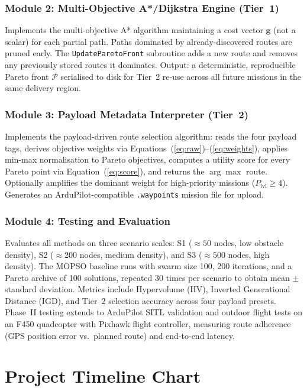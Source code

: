\documentclass{ssnreview}
\begin{document}
\subsection{Module 2: Multi-Objective A*/Dijkstra Engine (Tier~1)}
Implements the multi-objective A* algorithm maintaining a cost vector $\mathbf{g}$ (not
a scalar) for each partial path. Paths dominated by already-discovered routes are pruned
early. The \texttt{UpdateParetoFront} subroutine adds a new route and removes any
previously stored routes it dominates. Output: a deterministic, reproducible Pareto
front $\mathcal{P}$ serialised to disk for Tier~2 re-use across all future missions in
the same delivery region.

\subsection{Module 3: Payload Metadata Interpreter (Tier~2)}
Implements the payload-driven route selection algorithm: reads the four payload tags,
derives objective weights via Equations~(\ref{eq:raw})--(\ref{eq:weights}), applies
min-max normalisation to Pareto objectives, computes a utility score for every Pareto
point via Equation~(\ref{eq:score}), and returns the $\arg\max$ route. Optionally
amplifies the dominant weight for high-priority missions ($P_\mathrm{lvl} \geq 4$).
Generates an ArduPilot-compatible \texttt{.waypoints} mission file for upload.

\subsection{Module 4: Testing and Evaluation}
Evaluates all methods on three scenario scales: S1 (${\approx}50$ nodes, low obstacle
density), S2 (${\approx}200$ nodes, medium density), and S3 (${\approx}500$ nodes, high
density). The MOPSO baseline runs with swarm size 100, 200 iterations, and a Pareto
archive of 100 solutions, repeated 30 times per scenario to obtain mean $\pm$ standard
deviation. Metrics include Hypervolume (HV), Inverted Generational Distance (IGD), and
Tier~2 selection accuracy across four payload presets. Phase~II testing extends to
ArduPilot SITL validation and outdoor flight tests on an F450 quadcopter with Pixhawk
flight controller, measuring route adherence (GPS position error vs.\ planned route) and
end-to-end latency.

\chapter{Project Timeline Chart}\label{cha:timeline}
\end{document}
